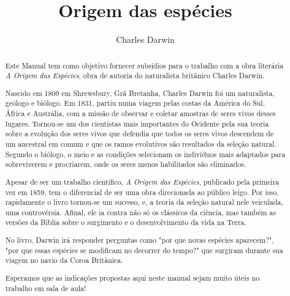\documentclass[12pt]{extarticle}
\begin{document}
\newcommand{\AutorLivro}{Charles Darwin}
\newcommand{\TituloLivro}{Origem das espécies}
\newcommand{\Tema}{História da ciência}
\newcommand{\Genero}{Tratado científico}
\newcommand{\imagemCapa}{./images/PNLD0060-01.png}
\newcommand{\issnppub}{---}
\newcommand{\issnepub}{---}
\newcommand{\colaborador}{\textbf{Fulano de Tal} é uma pessoa incrível e vai fazer um bom serviço.}


\title{\TituloLivro}
\author{\AutorLivro}
\def\authornotes{\colaborador}

\date{}
\maketitle






\begin{abstract}
Este Manual tem como objetivo fornecer subsídios para o trabalho com a
obra literária \emph{A Origem das Espécies}, obra de autoria do
naturalista britânico Charles Darwin.

Nascido em 1809 em Shrewsbury, Grã Bretanha, Charles Darwin foi um naturalista,
geólogo e biólogo. Em 1831, partiu numa viagem pelas costas da América do Sul,
África e Austrália, com a missão de observar e coletar amostras de seres vivos
desses lugares. Tornou-se um dos cientistas mais importantes do Ocidente pela 
sua teoria sobre a evolução dos seres vivos que defendia que todos os seres vivos 
descendem de um ancestral em comum e que os ramos evolutivos são resultados da 
seleção natural. Segundo o biólogo, o meio e as condições selecionam os indivíduos 
mais adaptados para sobreviverem e procriarem, onde os seres menos habilitados são eliminados.

Apesar de ser um trabalho científico, \emph{A Origem das Espécies}, publicado pela 
primeira vez em 1859, tem o diferencial de ser uma obra direcionada ao público leigo. 
Por isso, rapidamente o livro tornou-se um sucesso, e, a teoria da seleção natural 
nele veiculada, uma controvérsia. Afinal, ele ia contra não só os clássicos da ciência, 
mas também as versões da Bíblia sobre o surgimento e o desenvolvimento da vida na Terra.

No livro, Darwin irá responder perguntas como "por que novas espécies aparecem?", 
"por que essas espécies se modificam no decorrer do tempo?" que surgiram durante sua viagem
no navio da Coroa Britânica. 

Esperamos que as indicações propostas aqui neste manual sejam muito úteis no trabalho em
sala de aula!

\end{abstract}
\end{document}
